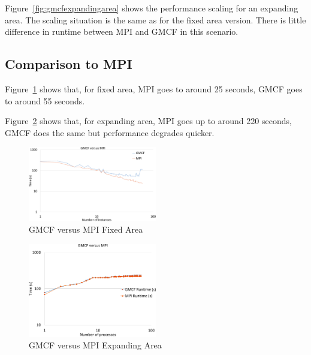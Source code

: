 Figure~\ref{fig:gmcfexpandingarea} shows the performance scaling for an
expanding area. The scaling situation is the same as for the fixed area version.
There is little difference in runtime between MPI and GMCF in this scenario.

\subsection{Comparison to MPI}

Figure~\ref{fig:gmcfmpifixedarea} shows that, for fixed area, MPI goes to around
25 seconds, GMCF goes to around 55 seconds.

Figure~\ref{fig:gmcfmpiexpandingarea} shows that, for expanding area, MPI goes
up to around 220 seconds, GMCF does the same but performance degrades quicker.

\begin{figure}
    \includegraphics[page=1,width=0.5\textwidth]
    {graphs/gmcf-versus-mpi-fixed-area-crop.pdf}
    \caption{GMCF versus MPI Fixed Area}
    \label{fig:gmcfmpifixedarea}
\end{figure}

\begin{figure}
    \includegraphics[page=1,width=0.5\textwidth]
    {graphs/gmcf-versus-mpi-expanding-area-crop.pdf}
    \caption{GMCF versus MPI Expanding Area}
    \label{fig:gmcfmpiexpandingarea}
\end{figure}
